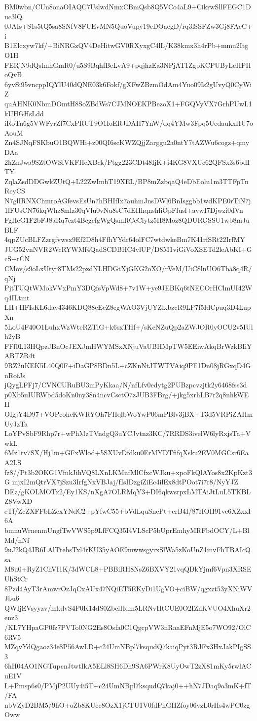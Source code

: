 BM0wbn/CUn8onaOIAQC7UslwdNmxCBmQsb8Q5VCo4aL9+CikrwSllFEGC1Duc3lQ
0JAIs+S1s5tQ5sa8SNfV8FUEvMN5QuoVupy19eDOaegD/rq3lSSFZw3Gj8FAcC+i
B1Elcxyw7kf/+BiNRGzQV4DeHitwGV0RXyxgC4lL/K38kmx3h4rPb+mmu2ItgO1H
FERjN9dQslmhGmR0/u5S9BqhfBeLvA9+pqjhzEa3NPjAT1ZgpKCPUByLeHPHoQvB
6yvSi95vncppIQYlU40dQNE03k6Fokf/gXFwZBzmOdAm4Yuo09Is2gUvyQ0CyWiZ
quAHNK0NbmDOmtH8SoZBdWs7CJMNOEKPBezoX1+FGQVyVX7GrhPUwL1kUHGHsLdd
iRoTn6g5VWFvrZf7CxPRUT9O1IoERJDAH7YnW/dq4YMw3Fpq5UedaukxHU7oAouM
Zn4SJNqFSKbuO1BQWHi+z00QI6scKWZQjjZarggu2a0ntY7tAZWu6cogz+qmyDAa
2hZnJwa9SZtOWSfVKFHeXBck/Ptgg223CDt48IjK+i4KG8VXUc62QFSx3s6bdITY
ZqlaZsdDDGwkZUtQ+L22ZwImbT19XEL/BP8mZzbqaQ4eDbEolu1m3TTFpTnReyCS
N7glIRNXChmroAGfevsEsUn7hBHIfIx7auhmJnsDWl6BnIsggbb1wdKPE0rTiN7j
1lFUsCN76kqWhz8mlz30qVlu0vNu8sC7dEHhqnshliOpFfusl+avwI7Djwzi0dVn
FgHeG1F2bFJ8aRu7czt4BcgefgWgQsmRCeClytz5H8Moz8QDURGSSU1wb8mJuBLF
4qpZUcBLFZzrgfvwsx9Ef2D8h4FfhYYdr64olFC7wtdwkeBm7K41rfSRt22IrfMY
JUG52vnNVR2WcRYWMf4QadSCDBHC4vlUP/D8M1viGiVoXSETd2leAbKI+GcS+rCN
CMov/s9oLxUtyr8TMs22pzdNLHDGtXjGKG2oXO/rVeM/UiC8lnUO6Tba8q4R/qNj
PjtTUQtWMokVVxPmY3DQfsVpWd8+7v1W+ye9JEBKq6tNECOrHClmUI42Wq4ILtmt
LH+HFIsKL6dav4346KDQ88cEcZ8egWAO3VjUYZlxbzcR9LP7f5IdCpuq3D4LupXn
5LoU4F40O1LuhxWzWteRZTlG+k6sxTHf+/sKeNZuQp2aZWJOR0yOCU2v5IUlh2yB
FFf0L13HQpzJBnOcJEXJmHWYMSxXNjuVaUBHMpTW5EEiwAkqBrWzkBIiYABTZR4t
9RZ2uKEK5L40Q0F+iDaGP8BDn5L+cZKnNtJTWTVAiq9PF1Dn08jRGxqD4GnRofJs
jQygLFFj7/CVNCURuBU3mPyKkaa/N/nfLfv0edytg2PUBzpcvzjtk2y6468fss3d
p0Xb5uIURWbd5doKn0ny38n4ncvCsctO7zJUB3FBrg/+jkg5xrhLB7r2q8nhkWEH
OIgjY4D97+VOPcoheKWRYOh7FHqlbWoYwP06mPBlv3jBX+T3d5VRPiZAHmUyJzTa
LoYPvSbF9Rhp7r+wPhMzTVndgQ3uYCJvtnz3KC/7RRDS3ivelW6lyRxjsTa+VwkL
6Mz1tv7SX/Hj1m+GFxWlod+5SXUvDfdku0ErMYDTfifqXsku2EV0MGCsr6EaA2LS
fz8//Pt3b2OKG1VfnkJihVQ8LXnLKMnfMlCfxcWJku+xpoFkQlAYos8x2KpKzt3G
mjxI2mQtrVX7jSzu3IrfgNxVBJaj/fIsIDzgiZiEc4ilEx8dtPOot7i7r8/NyYJZ
DEz/gKOLMOTx2/Ey1KS/nXgA7OLRMqY3+DI6qkwsrpxLMTAiJtLuL5TKBLZ8VwXD
eTf/ZcZXFFbLZexYNdC2+pYfwC55+bVdLquSnePt+crB4I/87HOH91vc6XZxxI6A
bmnuWrnenmUngfTwVWS5p9LfFCQ35I4VLScP5bUprEmhyMRFbdOCY/L+BlMd/nNf
9uJ2kQ4JR6LAlTtehsTxl4rKU35yAOE9mwwsgyrxSlWa5zKoUnZ1mvFhTBAIcQsa
M8u0+RyZ1ChVI1K/3dWCL8+PBBiRH8NsZ6BXVY21vqQDkYjmf6Vpn3XRSEUhStCr
8Pzd4AyT3rAmwrOzJqCxAUx47NQiET5EKyDi1UgVO+ciBW/qgxzt53yXNiWVJbu6
QWIjEVsyyzv/mkdvS4P0K14dS0ZbciHdm5LRNvHtCUE0O2IZnKVUO4XhuXr2enz3
/KL7YHpaGP0fz7PVTo0NG2Es8Osfa0C1QgcpVW3nRaaEFnMjE5o7WO92/OlC6RV5
MZqvYdQgaoz34e8P56AwLD+c24UmNBpl7ksqudQ7kaiqPyt3RJFx3HxJakPIgSS3
6hH04AO1NGTupcnJtwtIkA5ELl8SH6Dh9SA6PWrK8UyOwT2zX81mKy5rwlACuE1V
L+Pmsp6s0/PMjP2UUy4i5T+c24UmNBpl7ksqudQ7kaj0++hN7JDaq9o3mK+fT/FA
nbVZyD2BM5/9hO+oZb8KUcc8OzX1jCTU1V0fdPhGHZfoy06vzL0rHs4wPC0zgOww
